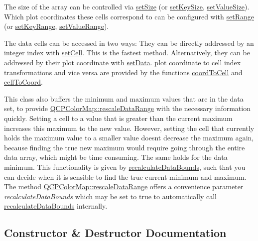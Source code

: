 The size of the array can be controlled via \hyperlink{classQCPColorMapData_a0d9ff35c299d0478b682bfbcdd9c097e}{set\+Size} (or \hyperlink{classQCPColorMapData_ac7ef70e383aface34b44dbde49234b6b}{set\+Key\+Size}, \hyperlink{classQCPColorMapData_a0893c9e3914513048b45e3429ffd16f2}{set\+Value\+Size}). Which plot coordinates these cells correspond to can be configured with \hyperlink{classQCPColorMapData_aad9c1c7c703c1339489fc730517c83d4}{set\+Range} (or \hyperlink{classQCPColorMapData_a0738c485f3c9df9ea1241b7a8bb6a86e}{set\+Key\+Range}, \hyperlink{classQCPColorMapData_ada1b2680ba96a5f4175b6d341cf75d23}{set\+Value\+Range}).

The data cells can be accessed in two ways\+: They can be directly addressed by an integer index with \hyperlink{classQCPColorMapData_a8e75eaf8746596319032a93f3d2d0683}{set\+Cell}. This is the fastest method. Alternatively, they can be addressed by their plot coordinate with \hyperlink{classQCPColorMapData_afd2083ccfd6987ec94aa7ef8e91ca39a}{set\+Data}. plot coordinate to cell index transformations and vice versa are provided by the functions \hyperlink{classQCPColorMapData_a26e33c5ec7094b60136350bcd77d3737}{coord\+To\+Cell} and \hyperlink{classQCPColorMapData_ac96d6e84befe7b9951b5da6d4d4a2a47}{cell\+To\+Coord}.

This class also buffers the minimum and maximum values that are in the data set, to provide \hyperlink{classQCPColorMap_a856608fa3dd1cc290bcd5f29a5575774}{Q\+C\+P\+Color\+Map\+::rescale\+Data\+Range} with the necessary information quickly. Setting a cell to a value that is greater than the current maximum increases this maximum to the new value. However, setting the cell that currently holds the maximum value to a smaller value doesn\textquotesingle{}t decrease the maximum again, because finding the true new maximum would require going through the entire data array, which might be time consuming. The same holds for the data minimum. This functionality is given by \hyperlink{classQCPColorMapData_ab235ade8a4d64bd3adb26a99b3dd57ee}{recalculate\+Data\+Bounds}, such that you can decide when it is sensible to find the true current minimum and maximum. The method \hyperlink{classQCPColorMap_a856608fa3dd1cc290bcd5f29a5575774}{Q\+C\+P\+Color\+Map\+::rescale\+Data\+Range} offers a convenience parameter {\itshape recalculate\+Data\+Bounds} which may be set to true to automatically call \hyperlink{classQCPColorMapData_ab235ade8a4d64bd3adb26a99b3dd57ee}{recalculate\+Data\+Bounds} internally. 

\subsection{Constructor \& Destructor Documentation}
